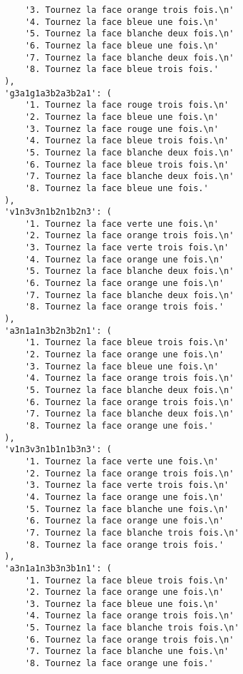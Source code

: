 \begin{lstlisting}
            '3. Tournez la face orange trois fois.\n'
            '4. Tournez la face bleue une fois.\n'
            '5. Tournez la face blanche deux fois.\n'
            '6. Tournez la face bleue une fois.\n'
            '7. Tournez la face blanche deux fois.\n'
            '8. Tournez la face bleue trois fois.'
        ),
        'g3a1g1a3b2a3b2a1': (
            '1. Tournez la face rouge trois fois.\n'
            '2. Tournez la face bleue une fois.\n'
            '3. Tournez la face rouge une fois.\n'
            '4. Tournez la face bleue trois fois.\n'
            '5. Tournez la face blanche deux fois.\n'
            '6. Tournez la face bleue trois fois.\n'
            '7. Tournez la face blanche deux fois.\n'
            '8. Tournez la face bleue une fois.'
        ),
        'v1n3v3n1b2n1b2n3': (
            '1. Tournez la face verte une fois.\n'
            '2. Tournez la face orange trois fois.\n'
            '3. Tournez la face verte trois fois.\n'
            '4. Tournez la face orange une fois.\n'
            '5. Tournez la face blanche deux fois.\n'
            '6. Tournez la face orange une fois.\n'
            '7. Tournez la face blanche deux fois.\n'
            '8. Tournez la face orange trois fois.'
        ),
        'a3n1a1n3b2n3b2n1': (
            '1. Tournez la face bleue trois fois.\n'
            '2. Tournez la face orange une fois.\n'
            '3. Tournez la face bleue une fois.\n'
            '4. Tournez la face orange trois fois.\n'
            '5. Tournez la face blanche deux fois.\n'
            '6. Tournez la face orange trois fois.\n'
            '7. Tournez la face blanche deux fois.\n'
            '8. Tournez la face orange une fois.'
        ),
        'v1n3v3n1b1n1b3n3': (
            '1. Tournez la face verte une fois.\n'
            '2. Tournez la face orange trois fois.\n'
            '3. Tournez la face verte trois fois.\n'
            '4. Tournez la face orange une fois.\n'
            '5. Tournez la face blanche une fois.\n'
            '6. Tournez la face orange une fois.\n'
            '7. Tournez la face blanche trois fois.\n'
            '8. Tournez la face orange trois fois.'
        ),
        'a3n1a1n3b3n3b1n1': (
            '1. Tournez la face bleue trois fois.\n'
            '2. Tournez la face orange une fois.\n'
            '3. Tournez la face bleue une fois.\n'
            '4. Tournez la face orange trois fois.\n'
            '5. Tournez la face blanche trois fois.\n'
            '6. Tournez la face orange trois fois.\n'
            '7. Tournez la face blanche une fois.\n'
            '8. Tournez la face orange une fois.'

\end{lstlisting}
